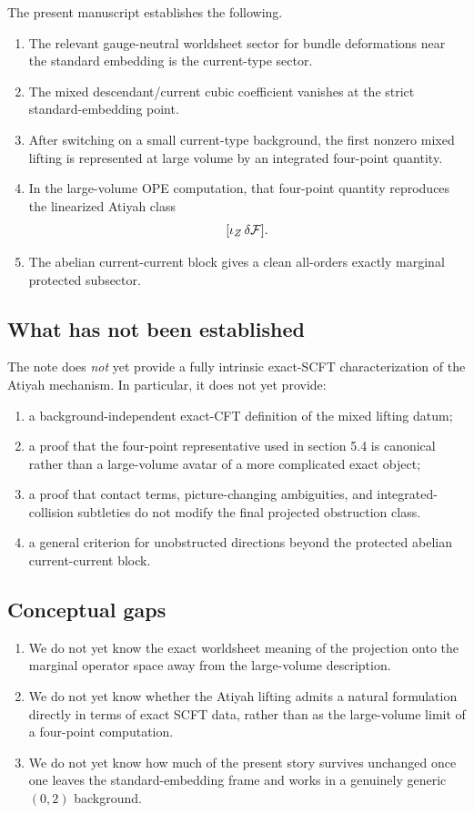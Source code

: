 \documentclass[11pt]{article}
\begin{document}
The present manuscript establishes the following.
\begin{enumerate}
\item The relevant gauge-neutral worldsheet sector for bundle deformations near the standard embedding is the current-type sector.
\item The mixed descendant/current cubic coefficient vanishes at the strict standard-embedding point.
\item After switching on a small current-type background, the first nonzero mixed lifting is represented at large volume by an integrated four-point quantity.
\item In the large-volume OPE computation, that four-point quantity reproduces the linearized Atiyah class
\[
[\iota_Z\,\delta{\cal F}].
\]
\item The abelian current-current block gives a clean all-orders exactly marginal protected subsector.
\end{enumerate}

\subsection*{What has not been established}

The note does \emph{not} yet provide a fully intrinsic exact-SCFT characterization of the Atiyah mechanism. In particular, it does not yet provide:
\begin{enumerate}
\item a background-independent exact-CFT definition of the mixed lifting datum;
\item a proof that the four-point representative used in section 5.4 is canonical rather than a large-volume avatar of a more complicated exact object;
\item a proof that contact terms, picture-changing ambiguities, and integrated-collision subtleties do not modify the final projected obstruction class.
\item a general criterion for unobstructed directions beyond the protected abelian current-current block.
\end{enumerate}

\subsection*{Conceptual gaps}

\begin{enumerate}
\item We do not yet know the exact worldsheet meaning of the projection onto the marginal operator space away from the large-volume description.
\item We do not yet know whether the Atiyah lifting admits a natural formulation directly in terms of exact SCFT data, rather than as the large-volume limit of a four-point computation.
\item We do not yet know how much of the present story survives unchanged once one leaves the standard-embedding frame and works in a genuinely generic $(0,2)$ background.
\end{enumerate}
\end{document}
